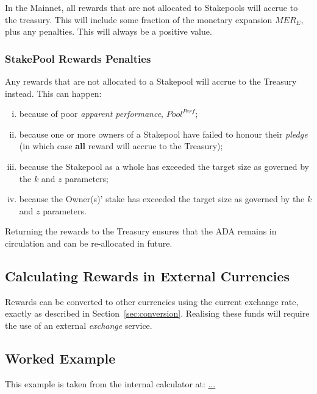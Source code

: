 \documentclass[11pt,a4paper,dvipsnames,twosided,final]{article}
\newcommand{\khcomment}[1]{\todo[color=blue!20]{KH: #1}}
\newcommand{\ada}{ADA{}}
\begin{document}
In the Mainnet, all rewards that are not allocated to Stakepools will accrue to the treasury.  This will include some fraction of the
monetary expansion $\textit{MER}_E$, plus any penalties.  This will always be a positive value.

\subsubsection*{StakePool Rewards Penalties}

Any rewards that are not allocated to a Stakepool will accrue to the Treasury instead.  This can happen: %

\begin{enumerate}[i)]
\item
  because of poor \emph{apparent performance}, $\textit{Pool}^{\textit{Perf}}$;
\item
  because one or more owners of a Stakepool have failed to honour their \emph{pledge} (in which case \textbf{all} reward will accrue to the Treasury);
\item
  because the Stakepool as a whole has exceeded the target size as governed by the $k$ and $z$ parameters;
\item
  because the Owner(s)' stake has exceeded the target size as governed by the $k$ and $z$ parameters.
\end{enumerate}

\noindent
Returning the rewards to the Treasury ensures that the \ada{} remains in circulation and can be re-allocated in future.



\subsection{Calculating Rewards in External Currencies}

Rewards can be converted to other currencies using the current exchange rate, exactly as described in
Section~\ref{sec:conversion}.  Realising these funds will require the use of an external \emph{exchange} service.

\clearpage
\subsection{Worked Example}

This example is taken from the \IOHK{} internal calculator at:
\url{...}
\end{document}
